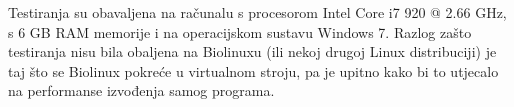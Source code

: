 Testiranja su obavaljena na računalu s procesorom Intel Core i7 920 @ 2.66 GHz, s 6 GB RAM memorije i na operacijskom sustavu Windows 7. Razlog zašto testiranja nisu bila obaljena na Biolinuxu (ili nekoj drugoj Linux distribuciji) je taj što se Biolinux pokreće u virtualnom stroju, pa je upitno kako bi to utjecalo na performanse izvođenja samog programa.